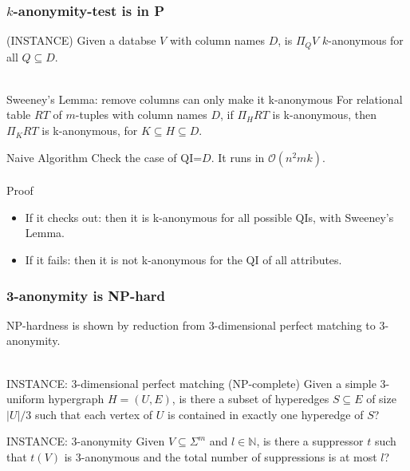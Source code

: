\documentclass{beamer}
\begin{document}
\begin{frame}
\frametitle{$k$-anonymity-test is in P}
\alert{(INSTANCE)} Given a databse $V$ with column names $D$, is $\Pi_{Q} V$ $k$-anonymous for all $Q \subseteq D$.\\~\\

\begin{block}{Sweeney's Lemma: remove columns can only make it k-anonymous}
For relational table $RT$ of $m$-tuples with column names $D$, if $\Pi_{H} RT$ is k-anonymous, then $\Pi_{K} RT$ is k-anonymous, for $K \subseteq H \subseteq D$.
\end{block}

\alert{Naive Algorithm}
Check the case of QI=$D$. It runs in $\mathcal{O}(n^2mk)$.\\~\\

\alert{Proof}
\begin{itemize}
    \item If it checks out: then it is k-anonymous \alert{for all possible QIs}, with Sweeney's Lemma.
    \item If it fails: then it is not k-anonymous \alert{for the QI of all attributes}.
\end{itemize}
\end{frame}

\begin{frame}
\frametitle{3-anonymity is NP-hard}
NP-hardness is shown by reduction from 3-dimensional perfect matching to 3-anonymity.\\~\\

\begin{block}{INSTANCE: 3-dimensional perfect matching (NP-complete)}
Given a simple 3-uniform hypergraph $H = (U, E)$, is there a subset of hyperedges $S \subseteq E$ of size $|U|/3$ such that each vertex of $U$ is contained in exactly one hyperedge of $S$?
\end{block}

\begin{block}{INSTANCE: 3-anonymity}
Given $V \subseteq \Sigma^{m}$ and $l \in \mathbb{N}$, is there a suppressor $t$ such that $t(V)$ is 3-anonymous and the total number of suppressions is at most $l$?
\end{block}
\end{frame}
\end{document}
